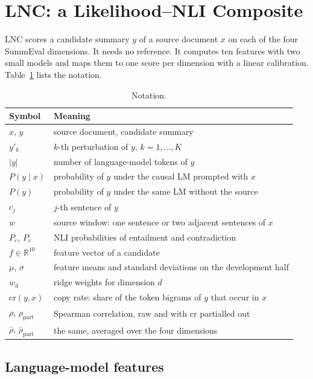 \section{LNC: a Likelihood--NLI Composite}
\label{sec:method}

LNC scores a candidate summary $y$ of a source document $x$ on each of the four SummEval dimensions. It needs no reference. It computes ten features with two small models and maps them to one score per dimension with a linear calibration. Table~\ref{tab:notation} lists the notation.

\begin{table}[t]
\centering
\caption{Notation.}
\label{tab:notation}
\small
\begin{tabular}{@{}ll@{}}
\toprule
Symbol & Meaning \\
\midrule
$x$, $y$ & source document, candidate summary \\
$y'_k$ & $k$-th perturbation of $y$, $k=1,\dots,K$ \\
$|y|$ & number of language-model tokens of $y$ \\
$P(y \mid x)$ & probability of $y$ under the causal LM prompted with $x$ \\
$P(y)$ & probability of $y$ under the same LM without the source \\
$c_j$ & $j$-th sentence of $y$ \\
$w$ & source window: one sentence or two adjacent sentences of $x$ \\
$P_e$, $P_c$ & NLI probabilities of entailment and contradiction \\
$f \in \mathbb{R}^{10}$ & feature vector of a candidate \\
$\mu$, $\sigma$ & feature means and standard deviations on the development half \\
$w_d$ & ridge weights for dimension $d$ \\
$\mathrm{cr}(y,x)$ & copy rate: share of the token bigrams of $y$ that occur in $x$ \\
$\rho$, $\rho_{\mathrm{part}}$ & Spearman correlation, raw and with $\mathrm{cr}$ partialled out \\
$\bar\rho$, $\bar\rho_{\mathrm{part}}$ & the same, averaged over the four dimensions \\
\bottomrule
\end{tabular}
\end{table}

\subsection{Language-model features}

